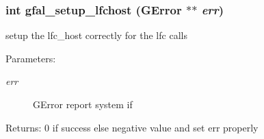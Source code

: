 \subsubsection{\setlength{\rightskip}{0pt plus 5cm}int gfal\_\-setup\_\-lfchost (GError $\ast$$\ast$ {\em err})}\label{lfc__ifce__ng_8h_8b53e5ce4ac805560b7536ff983fcaf7}


setup the lfc\_\-host correctly for the lfc calls \begin{Desc}
\item[Parameters:]
\begin{description}
\item[{\em err}]GError report system if \end{description}
\end{Desc}
\begin{Desc}
\item[Returns:]0 if success else negative value and set err properly \end{Desc}
